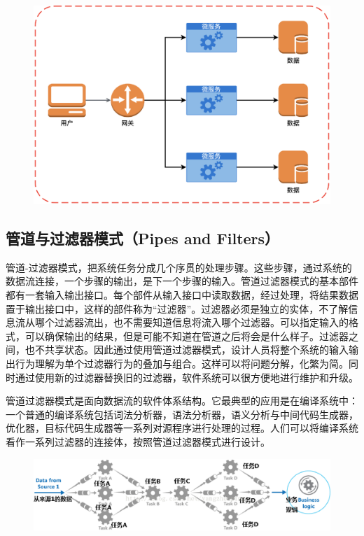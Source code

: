 \documentclass{SCIS2023cn}
\begin{document}
\begin{figure}[H]
	\centering
	\includegraphics[width=6.2in]{figs/Micro.eps}
	\label{fig_1}
\end{figure}

\subsection{管道与过滤器模式（Pipes and Filters）}

管道-过滤器模式，把系统任务分成几个序贯的处理步骤。这些步骤，通过系统的数据流连接，一个步骤的输出，是下一个步骤的输入。管道过滤器模式的基本部件都有一套输入输出接口。每个部件从输入接口中读取数据，经过处理，将结果数据置于输出接口中，这样的部件称为“过滤器”。过滤器必须是独立的实体，不了解信息流从哪个过滤器流出，也不需要知道信息将流入哪个过滤器。可以指定输入的格式，可以确保输出的结果，但是可能不知道在管道之后将会是什么样子。过滤器之间，也不共享状态。因此通过使用管道过滤器模式，设计人员将整个系统的输入输出行为理解为单个过滤器行为的叠加与组合。这样可以将问题分解，化繁为简。同时通过使用新的过滤器替换旧的过滤器，软件系统可以很方便地进行维护和升级。

管道过滤器模式是面向数据流的软件体系结构。它最典型的应用是在编译系统中：一个普通的编译系统包括词法分析器，语法分析器，语义分析与中间代码生成器，优化器，目标代码生成器等一系列对源程序进行处理的过程。人们可以将编译系统看作一系列过滤器的连接体，按照管道过滤器模式进行设计。

\begin{figure}[H]
	\centering
	\includegraphics[width=6.2in]{figs/pipe.eps}
	\label{fig_1}
\end{figure}
\end{document}
